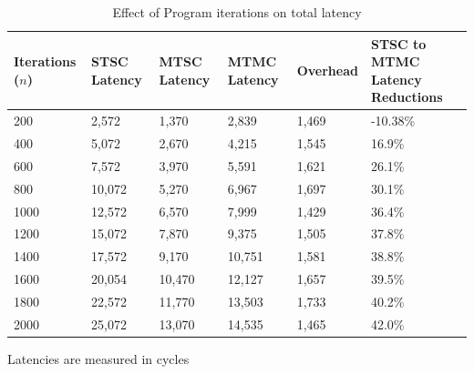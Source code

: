 \begin{table}
    \centering
    
    \begin{threeparttable}
    \begin{tabular}{l|l|l|l|l|l}
    \textbf{Iterations ($n$)} & \textbf{STSC Latency} & \textbf{MTSC Latency} & \textbf{MTMC Latency} & \textbf{Overhead} & \textbf{STSC to MTMC Latency Reductions}\\ \hline
     200        & 2,572               & 1,370                 & 2,839                 &  1,469         &    -10.38\%    \\
     400        & 5,072               & 2,670                 & 4,215                 &  1,545         &    16.9\%    \\
     600        & 7,572               & 3,970                 & 5,591                 &  1,621         &    26.1\%    \\
     800        & 10,072              & 5,270                 & 6,967                 &  1,697         &    30.1\%    \\
     1000       & 12,572              & 6,570                 & 7,999                 &  1,429         &    36.4\%    \\
     1200       & 15,072              & 7,870                 & 9,375                 &  1,505         &    37.8\%    \\
     1400       & 17,572              & 9,170                 & 10,751                &  1,581         &    38.8\%    \\
     1600       & 20,054              & 10,470                & 12,127                &  1,657         &    39.5\%    \\
     1800       & 22,572              & 11,770                & 13,503                &  1,733         &    40.2\%    \\
     2000       & 25,072              & 13,070                & 14,535                &  1,465         &    42.0\%    \\                                 
    \end{tabular}
    \begin{tablenotes}\footnotesize
        \item Latencies are measured in cycles
        \end{tablenotes}
    \end{threeparttable}
    \caption{Effect of Program iterations on total latency}
    \label{tbl:system_results}
\end{table}

